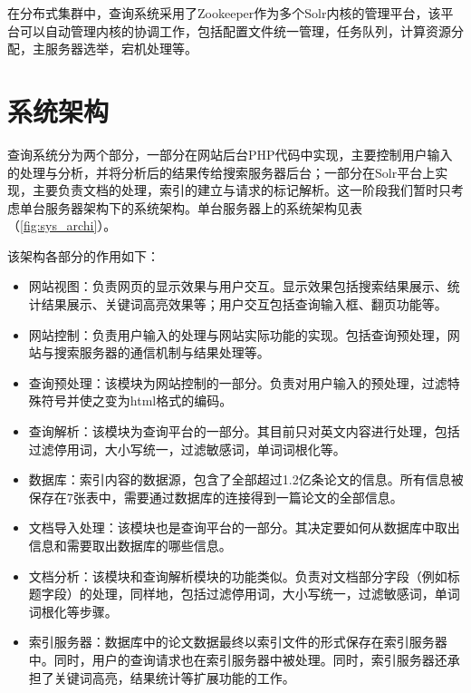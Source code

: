         在分布式集群中，查询系统采用了Zookeeper作为多个Solr内核的管理平台，该平台可以自动管理内核的协调工作，包括配置文件统一管理，任务队列，计算资源分配，主服务器选举，宕机处理等。
    
\section{系统架构}
    查询系统分为两个部分，一部分在网站后台PHP代码中实现，主要控制用户输入的处理与分析，并将分析后的结果传给搜索服务器后台；一部分在Solr平台上实现，主要负责文档的处理，索引的建立与请求的标记解析。这一阶段我们暂时只考虑单台服务器架构下的系统架构。单台服务器上的系统架构见表（\ref{fig:sys_archi}）。

\begin{figure}[!htp]
    \centering
    \resizebox{9cm}{!}{}
\end{figure}

    该架构各部分的作用如下：
    \begin{itemize}
    \item 网站视图：负责网页的显示效果与用户交互。显示效果包括搜索结果展示、统计结果展示、关键词高亮效果等；用户交互包括查询输入框、翻页功能等。
    \item 网站控制：负责用户输入的处理与网站实际功能的实现。包括查询预处理，网站与搜索服务器的通信机制与结果处理等。
    \item 查询预处理：该模块为网站控制的一部分。负责对用户输入的预处理，过滤特殊符号并使之变为html格式的编码。
    \item 查询解析：该模块为查询平台的一部分。其目前只对英文内容进行处理，包括过滤停用词，大小写统一，过滤敏感词，单词词根化等。
    \item 数据库：索引内容的数据源，包含了全部超过1.2亿条论文的信息。所有信息被保存在7张表中，需要通过数据库的连接得到一篇论文的全部信息。
    \item 文档导入处理：该模块也是查询平台的一部分。其决定要如何从数据库中取出信息和需要取出数据库的哪些信息。
    \item 文档分析：该模块和查询解析模块的功能类似。负责对文档部分字段（例如标题字段）的处理，同样地，包括过滤停用词，大小写统一，过滤敏感词，单词词根化等步骤。
    \item 索引服务器：数据库中的论文数据最终以索引文件的形式保存在索引服务器中。同时，用户的查询请求也在索引服务器中被处理。同时，索引服务器还承担了关键词高亮，结果统计等扩展功能的工作。
    \end{itemize}

